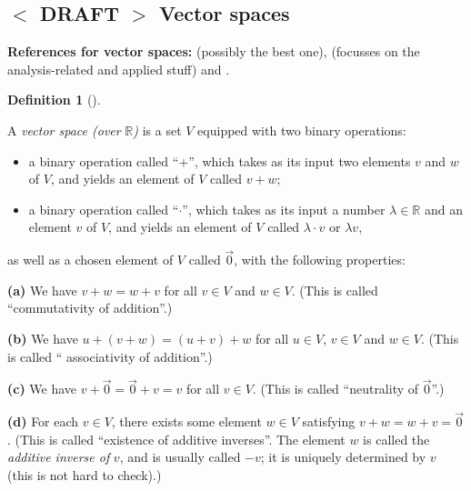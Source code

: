 \documentclass[numbers=enddot,12pt,final,onecolumn,notitlepage]{scrartcl}%
\theoremstyle{definition}
\newtheorem{defi}[theo]{Definition}
\newenvironment{definition}[1][]
{\begin{defi}[#1]\begin{leftbar}}
{\end{leftbar}\end{defi}}
\begin{document}
\subsection{%
$<$%
DRAFT%
$>$
Vector spaces}

\textbf{References for vector spaces:} \cite[\S 4.1-\S 4.2]{LaNaSc16}
(possibly the best one), \cite[\S 2.1]{OlvSha06} (focusses on the
analysis-related and applied stuff) and \cite[Two.I.1]{Heffer16}.

\begin{definition}
\label{def.vectspace}A \textit{vector space (over }$\mathbb{R}$\textit{)} is a
set $V$ equipped with two binary operations:

\begin{itemize}
\item a binary operation called \textquotedblleft$+$\textquotedblright, which
takes as its input two elements $v$ and $w$ of $V$, and yields an element of
$V$ called $v+w$;

\item a binary operation called \textquotedblleft$\cdot$\textquotedblright,
which takes as its input a number $\lambda\in\mathbb{R}$ and an element $v$ of
$V$, and yields an element of $V$ called $\lambda\cdot v$ or $\lambda v$,
\end{itemize}

as well as a chosen element of $V$ called $\overrightarrow{0}$, with the
following properties:

\textbf{(a)} We have $v+w=w+v$ for all $v\in V$ and $w\in V$. (This is called
\textquotedblleft commutativity of addition\textquotedblright.)

\textbf{(b)} We have $u+\left(  v+w\right)  =\left(  u+v\right)  +w$ for all
$u\in V$, $v\in V$ and $w\in V$. (This is called \textquotedblleft
associativity of addition\textquotedblright.)

\textbf{(c)} We have $v+\overrightarrow{0}=\overrightarrow{0}+v=v$ for all
$v\in V$. (This is called \textquotedblleft neutrality of $\overrightarrow{0}%
$\textquotedblright.)

\textbf{(d)} For each $v\in V$, there exists some element $w\in V$ satisfying
$v+w=w+v=\overrightarrow{0}$. (This is called \textquotedblleft existence of
additive inverses\textquotedblright. The element $w$ is called the
\textit{additive inverse of }$v$, and is usually called $-v$; it is uniquely
determined by $v$ (this is not hard to check).)


\end{definition}
\end{document}
